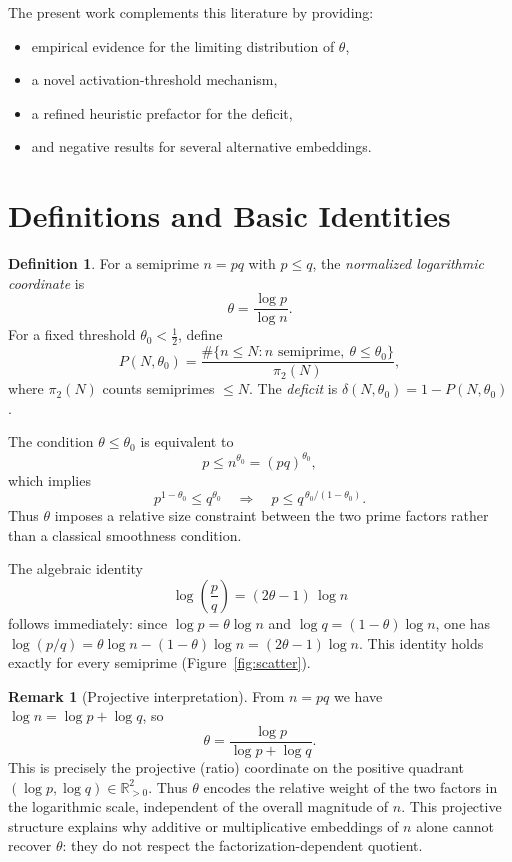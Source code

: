 \documentclass[11pt]{article}
\theoremstyle{definition}
\newtheorem{definition}{Definition}
\newtheorem{remark}{Remark}
\begin{document}
The present work complements this literature by providing:
\begin{itemize}
  \item empirical evidence for the limiting distribution of \(\theta\),
  \item a novel activation-threshold mechanism,
  \item a refined heuristic prefactor for the deficit,
  \item and negative results for several alternative embeddings.
\end{itemize}

\section{Definitions and Basic Identities}

\begin{definition}
For a semiprime \(n = pq\) with \(p \leq q\), the \emph{normalized logarithmic
coordinate} is
\[
  \theta = \frac{\log p}{\log n}.
\]
For a fixed threshold \(\theta_0 < \tfrac{1}{2}\), define
\[
  P(N,\theta_0) =
  \frac{\#\{n \le N : n\text{ semiprime},\ \theta \le \theta_0\}}{\pi_2(N)},
\]
where \(\pi_2(N)\) counts semiprimes \(\le N\).  The \emph{deficit} is
\(\delta(N,\theta_0) = 1 - P(N,\theta_0)\).
\end{definition}

The condition \(\theta \leq \theta_0\) is equivalent to
\[
  p \leq n^{\theta_0} = (pq)^{\theta_0},
\]
which implies
\[
  p^{1-\theta_0} \leq q^{\theta_0} \quad \Longrightarrow \quad
  p \leq q^{\,\theta_0/(1-\theta_0)}.
\]
Thus \(\theta\) imposes a relative size constraint between the two prime factors rather
than a classical smoothness condition.

The algebraic identity
\begin{equation}\label{eq:identity}
  \log\!\left(\frac{p}{q}\right) = (2\theta - 1)\,\log n
\end{equation}
follows immediately: since \(\log p = \theta\log n\) and \(\log q = (1-\theta)\log n\),
one has \(\log(p/q) = \theta\log n - (1-\theta)\log n = (2\theta-1)\log n\).  This
identity holds exactly for every semiprime (Figure~\ref{fig:scatter}).

\begin{remark}[Projective interpretation]
From \(n = pq\) we have \(\log n = \log p + \log q\), so
\[
  \theta = \frac{\log p}{\log p + \log q}.
\]
This is precisely the projective (ratio) coordinate on the positive quadrant
\((\log p, \log q) \in \mathbb{R}_{>0}^2\).  Thus \(\theta\) encodes the relative
weight of the two factors in the logarithmic scale, independent of the overall
magnitude of \(n\).  This projective structure explains why additive or multiplicative
embeddings of \(n\) alone cannot recover \(\theta\): they do not respect the
factorization-dependent quotient.
\end{remark}
\end{document}
